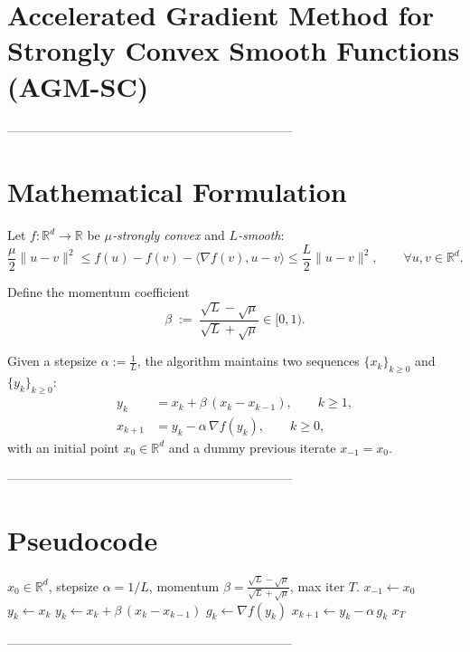 \documentclass{article}
\begin{document}
\section*{Accelerated Gradient Method for Strongly Convex Smooth Functions (AGM-SC)}

--------------------------------------------------------------------
\section*{Mathematical Formulation}
Let $f:\mathbb{R}^{d}\rightarrow\mathbb{R}$ be \emph{$\mu$‑strongly convex} and \emph{$L$‑smooth}:
\[
\frac{\mu}{2}\|u-v\|^{2}\le f(u)-f(v)-\langle\nabla f(v),u-v\rangle\le\frac{L}{2}\|u-v\|^{2},
\qquad\forall u,v\in\mathbb{R}^{d}.
\]

Define the momentum coefficient
\[
\beta\;:=\;\frac{\sqrt{L}-\sqrt{\mu}}{\sqrt{L}+\sqrt{\mu}}\in[0,1).
\]

Given a stepsize $\alpha:=\frac{1}{L}$, the algorithm maintains two sequences
$\{x_k\}_{k\ge 0}$ and $\{y_k\}_{k\ge 0}$:
\[
\boxed{
\begin{aligned}
y_k &= x_k + \beta\,(x_k-x_{k-1}),\qquad k\ge 1,\\[4pt]
x_{k+1} &= y_k - \alpha\,\nabla f(y_k),\qquad k\ge 0,
\end{aligned}}
\]
with an initial point $x_0\in\mathbb{R}^{d}$ and a dummy previous iterate $x_{-1}=x_0$.

--------------------------------------------------------------------
\section*{Pseudocode}
\begin{algorithm}[H]
\caption{AGM‑SC}
\begin{algorithmic}[1]
\Require $x_0\in\mathbb{R}^{d}$, stepsize $\alpha=1/L$, momentum $\beta=\frac{\sqrt L-\sqrt\mu}{\sqrt L+\sqrt\mu}$, max iter $T$.
\State $x_{-1}\gets x_0$ 
        \State $y_k \gets x_k$ 
    \Else
        \State $y_k \gets x_k + \beta\,(x_k-x_{k-1})$ 
    \EndIf
    \State $g_k \gets \nabla f(y_k)$
    \State $x_{k+1} \gets y_k - \alpha\, g_k$ 
\EndFor
\State \Return $x_T$
\end{algorithmic}
\end{algorithm}

--------------------------------------------------------------------
\end{document}
